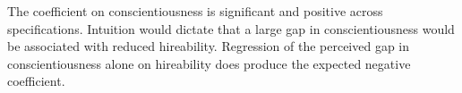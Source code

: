 \documentclass[review]{elsarticle}
\begin{document}
The coefficient on conscientiousness is significant and positive across specifications.
Intuition would dictate that a large gap in conscientiousness would be associated with reduced hireability.
Regression of the perceived gap in conscientiousness alone on hireability does produce the expected negative coefficient.
%
%
\end{document}
